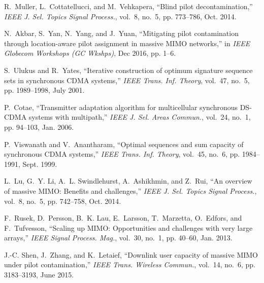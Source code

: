 \documentclass[conference]{IEEEtran}
\begin{document}
\begin{thebibliography}{17}
R.~Muller, L.~Cottatellucci, and M.~Vehkapera, ``Blind pilot decontamination,'' \emph{{IEEE} J. Sel. Topics Signal Process.}, vol.~8, no.~5, pp. 773--786, Oct. 2014.

N.~Akbar, S.~Yan, N.~Yang, and J.~Yuan, ``Mitigating pilot contamination through location-aware pilot assignment in massive MIMO networks,'' in \emph{IEEE Globecom Workshops (GC Wkshps)}, Dec 2016, pp. 1--6.

S.~Ulukus and R.~Yates, ``Iterative construction of optimum signature sequence sets in synchronous {CDMA} systems,'' \emph{{IEEE} Trans. Inf. Theory}, vol.~47, no.~5, pp. 1989--1998, July 2001.

P.~Cotae, ``Transmitter adaptation algorithm for multicellular synchronous {DS-CDMA} systems with multipath,'' \emph{{IEEE} J. Sel. Areas Commun.}, vol.~24, no.~1, pp. 94--103, Jan. 2006.

P.~Viswanath and V.~Anantharam, ``Optimal sequences and sum capacity of synchronous {CDMA} systems,'' \emph{{IEEE} Trans. Inf. Theory}, vol.~45, no.~6, pp. 1984--1991, Sept. 1999.

L.~Lu, G.~Y. Li, A.~L. Swindlehurst, A.~Ashikhmin, and Z.~Rui, ``An overview of massive {MIMO}: Benefits and challenges,'' \emph{{IEEE} J. Sel. Topics Signal Process.}, vol.~8, no.~5, pp. 742--758, Oct. 2014.

F.~Rusek, D.~Persson, B.~K. Lau, E.~Larsson, T.~Marzetta, O.~Edfors, and F.~Tufvesson, ``Scaling up {MIMO}: Opportunities and challenges with very large arrays,'' \emph{{IEEE} Signal Process. Mag.}, vol.~30, no.~1, pp. 40--60, Jan. 2013.

J.-C. Shen, J.~Zhang, and K.~Letaief, ``Downlink user capacity of massive {MIMO} under pilot contamination,'' \emph{{IEEE} Trans. Wireless Commun.}, vol.~14, no.~6, pp. 3183--3193, June 2015.

\end{thebibliography}
\end{document}
